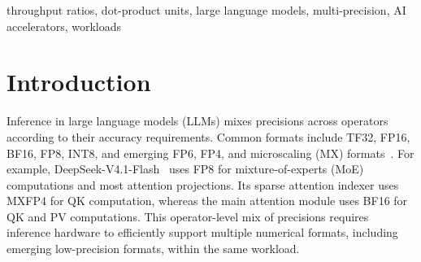\documentclass[conference,10pt,letterpaper]{IEEEtran}
\title{\PaperTitle\par\vspace{14pt}}
\author{\IEEEauthorblockN{Anonymous Submission}}
\DeclareRobustCommand{\tpratio}[3]{\ensuremath{#1\mkern2mu{:}\mkern2mu#2\mkern2mu{:}\mkern2mu#3}}
\begin{document}
\maketitle

\suppressfloats[t]


\begin{abstract}
Large language models evolve faster than accelerators can be designed and fabricated. Commercial AI accelerators implement different BF16:MXFP8:MXFP4 peak throughput ratios. As more operators adopt lower precision, chip designers must choose a fixed ratio for workloads that will continue to evolve. DP-Puzzle explores these ratios with composable dot-product units, using synthesized area and workload-driven power estimates to model chip throughput across precision-migration scenarios. We find that the tensor-core power budget is the main limit on usable low-precision throughput. Under baseline area and power budgets, \tpratio{1}{4}{8} offers a balanced choice across five DeepSeek-V4.1-Flash prefill scenarios, yielding a modeled $1.15\times$ GEMM speedup over \tpratio{1}{2}{4}.
\end{abstract}
\begin{IEEEkeywords}
throughput ratios, dot-product units, large language models, multi-precision, AI accelerators, workloads
\end{IEEEkeywords}

\section{Introduction}
\label{sec:introduction}
Inference in large language models (LLMs) mixes precisions across operators according to their accuracy requirements. Common formats include TF32, FP16, BF16, FP8, INT8, and emerging FP6, FP4, and microscaling (MX) formats~\cite{ocpmx2023}. For example, DeepSeek-V4.1-Flash~\cite{deepseekv41source} uses FP8 for mixture-of-experts (MoE) computations and most attention projections. Its sparse attention indexer uses MXFP4 for QK computation, whereas the main attention module uses BF16 for QK and PV computations. This operator-level mix of precisions requires inference hardware to efficiently support multiple numerical formats, including emerging low-precision formats, within the same workload.
\end{document}
